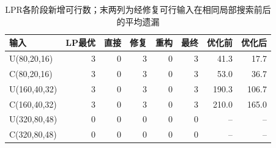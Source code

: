 \begin{table}[htbp]
\centering\footnotesize
\caption{LPR各阶段新增可行数；末两列为经修复可行输入在相同局部搜索前后的平均遗漏}\label{tab:rounding-outcomes}
\begin{tabular}{lrrrrrrr}\toprule
输入 & LP最优 & 直接 & 修复 & 重构 & 最终 & 优化前 & 优化后 \\\midrule
U(80,20,16) & 3 & 0 & 3 & 0 & 3 & 41.3 & 17.7 \\
C(80,20,16) & 3 & 0 & 3 & 0 & 3 & 53.0 & 36.7 \\
U(160,40,32) & 3 & 0 & 3 & 0 & 3 & 190.3 & 106.7 \\
C(160,40,32) & 3 & 0 & 3 & 0 & 3 & 210.0 & 165.0 \\
U(320,80,48) & 0 & 0 & 0 & 0 & 0 & -- & -- \\
C(320,80,48) & 0 & 0 & 0 & 0 & 0 & -- & -- \\
\bottomrule\end{tabular}
\end{table}
